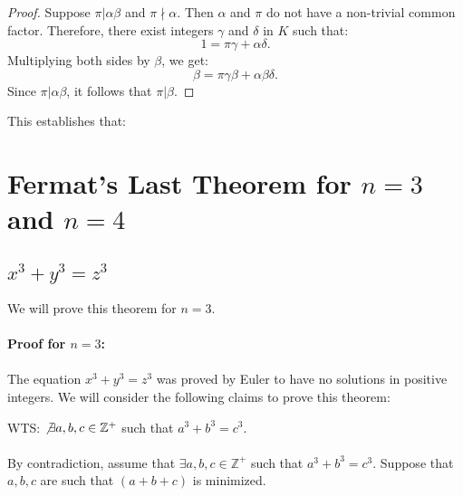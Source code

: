 \documentclass{article}
\begin{document}

\begin{proof}
Suppose \( \pi | \alpha \beta \) and \( \pi \nmid \alpha \). Then \( \alpha \) and \( \pi \) do not have a non-trivial common factor. Therefore, there exist integers \( \gamma \) and \( \delta \) in \( K \) such that:
\[
1 = \pi \gamma + \alpha \delta.
\]
Multiplying both sides by \( \beta \), we get:
\[
\beta = \pi \gamma \beta + \alpha \beta \delta.
\]
Since \( \pi | \alpha \beta \), it follows that \( \pi | \beta \).
\end{proof}

This establishes that:



\section{Fermat's Last Theorem for $n = 3$ and $n = 4$}

\subsection{$x^3 + y^3 = z^3$}


We will prove this theorem for $n = 3$.\\\\
\textbf{Proof for $n = 3$:} \\\\
The equation \( x^3 + y^3 = z^3 \) was proved by Euler to have no solutions in positive integers. We will consider the following claims to prove this theorem:

WTS: $\not\exists a, b, c \in \mathbb{Z}^+$ such that $a^3 + b^3 = c^3$.\\\\
By contradiction, assume that $\exists a, b, c \in \mathbb{Z}^+$ such that $a^3 + b^3 = c^3$. Suppose that \(a, b, c\) are such that \((a + b + c)\) is minimized.\\\\
\end{document}
